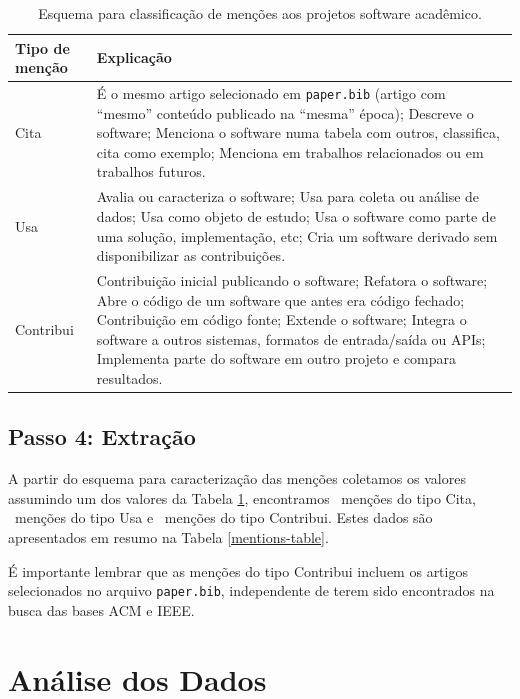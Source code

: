 \begin{table}[h]
\caption{Esquema para classificação de menções aos projetos software acadêmico.}
\centering
\begin{tabular}{ l p{10cm} }
  \hline
  Tipo de menção           & Explicação \\
  \hline
  Cita      & É o mesmo artigo selecionado em \texttt{paper.bib} (artigo com ``mesmo'' conteúdo publicado na ``mesma'' época); Descreve o software; Menciona o software numa tabela com outros, classifica, cita como exemplo; Menciona em trabalhos relacionados ou em trabalhos futuros. \\
  Usa       & Avalia ou caracteriza o software; Usa para coleta ou análise de dados; Usa como objeto de estudo; Usa o software como parte de uma solução, implementação, etc; Cria um software derivado sem disponibilizar as contribuições. \\
  Contribui & Contribuição inicial publicando o software; Refatora o software; Abre o código de um software que antes era código fechado; Contribuição em código fonte; Extende o software; Integra o software a outros sistemas, formatos de entrada/saída ou APIs; Implementa parte do software em outro projeto e compara resultados. \\
  \hline
\end{tabular}
\label{esquema-de-mencao}
\end{table}

\subsection{Passo 4: Extração}

A partir do esquema para caracterização das menções coletamos os valores
assumindo um dos valores da Tabela \ref{esquema-de-mencao}, encontramos
\CiteCount \ menções do tipo Cita, \UseCount \ menções do tipo Usa e
\ContributeCount \ menções do tipo Contribui. Estes dados são
apresentados em resumo na Tabela \ref{mentions-table}.



É importante lembrar que as menções do tipo Contribui incluem os artigos
selecionados no arquivo \texttt{paper.bib}, independente de terem sido
encontrados na busca das bases ACM e IEEE.


\section{Análise dos Dados} \label{estudo2:analise} %

